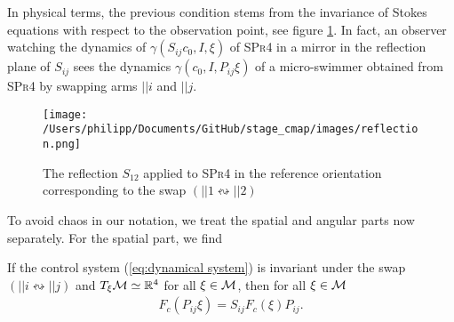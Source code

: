 \begin{remark}
In physical terms, the previous condition stems from the invariance of Stokes equations with respect to the observation point, see figure \ref{fig:reflection of swimmer}. In fact, an observer watching the dynamics of $\gamma(S_{ij}c_0, I, \xi)$ of \textsc{SPr4} in a mirror in the reflection plane of $S_{ij}$ sees the dynamics $\gamma(c_0, I, P_{ij} \xi)$ of a micro-swimmer obtained from \textsc{SPr4} by swapping arms $||i$ and $||j$.
\end{remark}

\begin{figure}[h]
\label{fig:reflection of swimmer}
\centering
\texttt{[image: /Users/philipp/Documents/GitHub/stage\_cmap/images/reflection.png]}
\caption{The reflection $S_{12}$ applied to \textsc{SPr4} in the reference orientation corresponding to the swap $(||1 \leftrightsquigarrow ||2)$ }
\end{figure}


To avoid chaos in our notation, we treat the spatial and angular parts now separately. For the spatial part, we find

\begin{proposition}
\label{prop: spatial permutation invariance}
If the control system (\ref{eq:dynamical system}) is invariant under the swap $(||i \leftrightsquigarrow ||j)$ and $T_{\xi} \mathcal{M} \simeq \mathbb{R}^4$ for all $\xi \in \mathcal{M}$, then for all $\xi \in \mathcal{M}$
\begin{align}
	 F_c(P_{ij} \xi) = S_{ij} F_c(\xi) P_{ij}.
\end{align}
\end{proposition}

